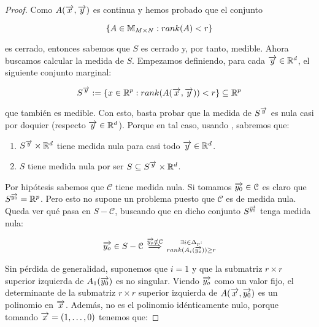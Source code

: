 \begin{proof}

    Como $A(\overrightarrow{x}, \overrightarrow{y})$ es continua y hemos probado que el conjunto

    $$\{ A \in \mathbb{M}_{M \times N}: rank(A) < r \}$$

    es cerrado, entonces sabemos que $S$ es cerrado y, por tanto, medible. Ahora buscamos calcular la medida de $S$. Empezamos definiendo, para cada $\overrightarrow{y} \in \mathbb{R}^d$, el siguiente conjunto marginal:

    \begin{equation}
        S^{\overrightarrow{y}} := \{ x \in \mathbb{R}^p: rank(A(\overrightarrow{x}, \overrightarrow{y})) < r \} \subseteq \mathbb{R}^p
    \end{equation}

    que también es medible. Con esto, basta probar que la medida de $S^{\overrightarrow{y}}$ es nula casi por doquier (respecto $\overrightarrow{y} \in \mathbb{R}^d$). Porque en tal caso, usando , sabremos que:

    \begin{enumerate}
        \item $S^{\overrightarrow{y}} \times \mathbb{R}^d$ tiene medida nula para casi todo $\overrightarrow{y} \in \mathbb{R}^d$.
        \item $S$ tiene medida nula por ser $S \subseteq S^{\overrightarrow{y}} \times \mathbb{R}^d$.
    \end{enumerate}

    Por hipótesis sabemos que $\mathcal{C}$ tiene medida nula. Si tomamos $\overrightarrow{y_0} \in \mathcal{C}$ es claro que $S^{\overrightarrow{y_0}} = \mathbb{R}^p$. Pero esto no supone un problema puesto que $\mathcal{C}$ es de medida nula. Queda ver qué pasa en $S - \mathcal{C}$, buscando que en dicho conjunto $S^{\overrightarrow{y_0}}$ tenga medida nula:

    \begin{equation}
        \begin{split}
            \overrightarrow{y_o} \in S - \mathcal{C} \stackrel{\overrightarrow{y_o} \notin \mathcal{C}}{\implies} \substack{\exists i \in \Delta_{p}: \\ rank(A_i(\overrightarrow{y_o})) \geq r}
        \end{split}
    \end{equation}

    Sin pérdida de generalidad, suponemos que $i = 1$ y que la submatriz $r \times r$ superior izquierda de $A_1(\overrightarrow{y_0})$ es no singular. Viendo $\overrightarrow{y_o}$ como un valor fijo, el determinante de la submatriz $r \times r$ superior izquierda de $A(\overrightarrow{x}, \overrightarrow{y_0})$ es un polinomio en $\overrightarrow{x}$. Además, no es el polinomio idénticamente nulo, porque tomando $\overrightarrow{x} = (1, \ldots, 0)$ tenemos que:


\end{proof}
